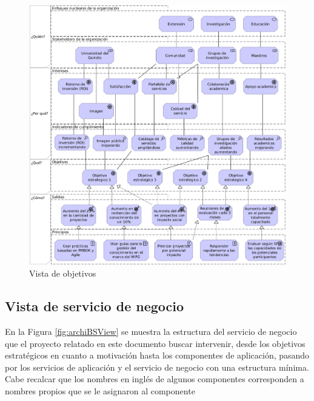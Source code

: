 \begin{figure}[H]
	\centering
	\includegraphics[scale=0.12]{tablas-images/archi/Goals View.jpg}
	\caption{Vista de objetivos}
    \label{fig:archiGoalsView}
\end{figure}

\subsection{Vista de servicio de negocio}
\noindent
En la Figura \ref{fig:archiBSView} se muestra la estructura del servicio de negocio que el proyecto relatado en este documento buscar intervenir, desde los objetivos estratégicos en cuanto a motivación hasta los componentes de aplicación, pasando por los servicios de aplicación y el servicio de negocio con una estructura mínima. Cabe recalcar que los nombres en inglés de algunos componentes corresponden a nombres propios que se le asignaron al componente

